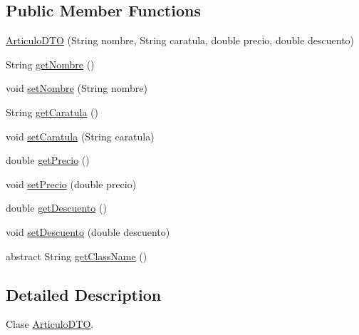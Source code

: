 \subsection*{Public Member Functions}
\begin{DoxyCompactItemize}
\item 
\mbox{\hyperlink{classes_1_1deusto_1_1server_1_1dto_1_1_articulo_d_t_o_a89818e8393a667a135cb35317aa7e906}{Articulo\+D\+TO}} (String nombre, String caratula, double precio, double descuento)
\item 
String \mbox{\hyperlink{classes_1_1deusto_1_1server_1_1dto_1_1_articulo_d_t_o_a895eeddab3e2140d41d2689b9b382ac4}{get\+Nombre}} ()
\item 
void \mbox{\hyperlink{classes_1_1deusto_1_1server_1_1dto_1_1_articulo_d_t_o_a9e9a4e45fb1538231674660fcb5ca4e1}{set\+Nombre}} (String nombre)
\item 
String \mbox{\hyperlink{classes_1_1deusto_1_1server_1_1dto_1_1_articulo_d_t_o_a62812218cc960b644b7b5f3beba0a015}{get\+Caratula}} ()
\item 
void \mbox{\hyperlink{classes_1_1deusto_1_1server_1_1dto_1_1_articulo_d_t_o_a844cc9d811afd3a03ae598f462318d8c}{set\+Caratula}} (String caratula)
\item 
double \mbox{\hyperlink{classes_1_1deusto_1_1server_1_1dto_1_1_articulo_d_t_o_aaa5d33895a4ba9292afc8c8ad55f458f}{get\+Precio}} ()
\item 
void \mbox{\hyperlink{classes_1_1deusto_1_1server_1_1dto_1_1_articulo_d_t_o_a11825b551df1daabf677064a2cc1e5a4}{set\+Precio}} (double precio)
\item 
double \mbox{\hyperlink{classes_1_1deusto_1_1server_1_1dto_1_1_articulo_d_t_o_aefb16b0eff4222bd833be83c274122a0}{get\+Descuento}} ()
\item 
void \mbox{\hyperlink{classes_1_1deusto_1_1server_1_1dto_1_1_articulo_d_t_o_a73d6bb2d7de2b080f12a2fa47642adae}{set\+Descuento}} (double descuento)
\item 
abstract String \mbox{\hyperlink{classes_1_1deusto_1_1server_1_1dto_1_1_articulo_d_t_o_a71ceba29b36e2e323f8a770e6cec89ef}{get\+Class\+Name}} ()
\end{DoxyCompactItemize}


\subsection{Detailed Description}
Clase \mbox{\hyperlink{classes_1_1deusto_1_1server_1_1dto_1_1_articulo_d_t_o}{Articulo\+D\+TO}}. 

